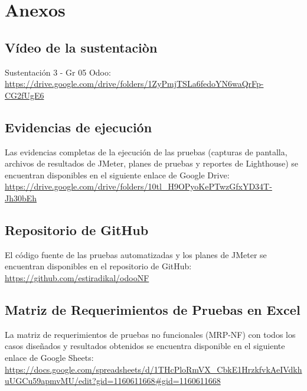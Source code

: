 \documentclass[12pt, letterpaper]{article}
\begin{document}
\newpage

\section{Anexos}

\subsection*{Vídeo de la sustentaciòn}

Sustentación 3 - Gr 05 Odoo: \\
\url{https://drive.google.com/drive/folders/1ZyPmjTSLa6fedoYN6waQrFp-CG2fUgE6}


\subsection*{Evidencias de ejecución}

Las evidencias completas de la ejecución de las pruebas (capturas de pantalla, archivos de resultados de JMeter, planes de pruebas y reportes de Lighthouse) se encuentran disponibles en el siguiente enlace de Google Drive: \\
\url{https://drive.google.com/drive/folders/10tl_H9OPyoKePTwzGfxYD34T-Jh30bEh}

\subsection*{Repositorio de GitHub}

El código fuente de las pruebas automatizadas y los planes de JMeter se encuentran disponibles en el repositorio de GitHub: \\
\url{https://github.com/estiradikal/odooNF}

\subsection*{Matriz de Requerimientos de Pruebas en Excel}

La matriz de requerimientos de pruebas no funcionales (MRP-NF) con todos los casos diseñados y resultados obtenidos se encuentra disponible en el siguiente enlace de Google Sheets: \\
\url{https://docs.google.com/spreadsheets/d/1THcPloRmVX_CbkE1HrzkfvkAeIVdkhuUGCu59apmvMU/edit?gid=1160611668#gid=1160611668}
\end{document}
